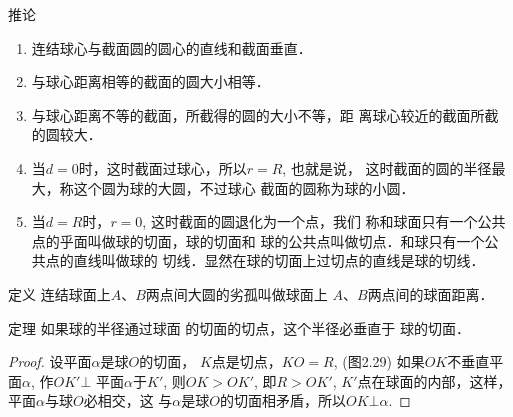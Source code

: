 \begin{blk}{推论}
\begin{enumerate}
\item 连结球心与截面圆的圆心的直线和截面垂直．
\item 与球心距离相等的截面的圆大小相等．
\item 与球心距离不等的截面，所截得的圆的大小不等，距
离球心较近的截面所截的圆较大．
\item 当$d=0$时，这时截面过球心，所以$r=R$, 也就是说，
这时截面的圆的半径最大，称这个圆为球的大圆，不过球心
截面的圆称为球的小圆．
\item 当$d=R$时，$r=0$, 这时截面的圆退化为一个点，我们
称和球面只有一个公共点的乎面叫做球的切面，球的切面和
球的公共点叫做切点．和球只有一个公共点的直线叫做球的
切线．显然在球的切面上过切点的直线是球的切线．
\end{enumerate}
    
\end{blk}

\begin{blk}{定义} 
    连结球面上$A$、$B$两点间大圆的劣孤叫做球面上
$A$、$B$两点间的球面距离．
\end{blk}

\begin{blk}
    {定理} 如果球的半径通过球面
    的切面的切点，这个半径必垂直于
    球的切面．
\end{blk}

\begin{figure}[htp]
    \centering
{}   
    \caption{}
\end{figure}

\begin{proof}
    设平面$\alpha$是球$O$的切面，
    $K$点是切点，$KO=R$, (图2.29)
    如果$OK$不垂直平面$\alpha$, 作$OK'\bot$
    平面$\alpha$于$K'$, 则$OK>OK'$, 即$R>OK'$, $K'$点在球面的内部，这样，平面$\alpha$与球$O$必相交，这
与$\alpha$是球$O$的切面相矛盾，所以$OK\bot\alpha$.
\end{proof}

